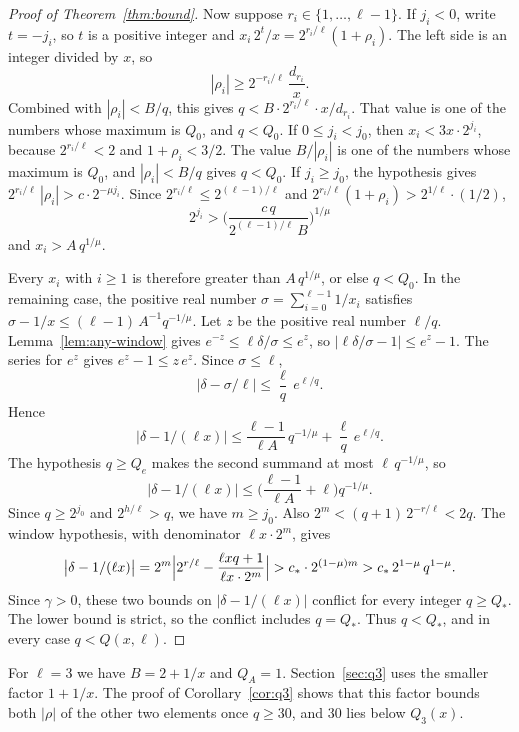 \documentclass[11pt]{article}
\begin{document}
\begin{proof}[Proof of Theorem~\ref{thm:bound}]
Now suppose $r_i \in \{1, \ldots, \ell-1\}$.
If $j_i < 0$, write $t = -j_i$, so $t$ is a positive integer and $x_i\, 2^{t}/x = 2^{r_i/\ell}(1+\rho_i)$.
The left side is an integer divided by $x$, so
\[
|\rho_i| \ge 2^{-r_i/\ell}\, \frac{d_{r_i}}{x}.
\]
Combined with $|\rho_i| < B/q$, this gives $q < B \cdot 2^{r_i/\ell} \cdot x / d_{r_i}$.
That value is one of the numbers whose maximum is $Q_0$, and $q < Q_0$.
If $0 \le j_i < j_0$, then $x_i < 3x \cdot 2^{j_i}$, because $2^{r_i/\ell} < 2$ and $1+\rho_i < 3/2$.
The value $B/|\rho_i|$ is one of the numbers whose maximum is $Q_0$, and $|\rho_i| < B/q$ gives $q < Q_0$.
If $j_i \ge j_0$, the hypothesis gives $2^{r_i/\ell}\, |\rho_i| > c \cdot 2^{-\mu j_i}$.
Since $2^{r_i/\ell} \le 2^{(\ell-1)/\ell}$ and $2^{r_i/\ell}(1+\rho_i) > 2^{1/\ell}\cdot(1/2)$,
\[
2^{j_i} > \Biggl( \frac{c\, q}{2^{(\ell-1)/\ell}\, B} \Biggr)^{1/\mu}
\]
and $x_i > A\, q^{1/\mu}$.

Every $x_i$ with $i \ge 1$ is therefore greater than $A\, q^{1/\mu}$, or else $q < Q_0$.
In the remaining case, the positive real number $\sigma = \sum_{i=0}^{\ell-1} 1/x_i$ satisfies $\sigma - 1/x \le (\ell-1)\, A^{-1} q^{-1/\mu}$.
Let $z$ be the positive real number $\ell/q$.
Lemma~\ref{lem:any-window} gives $e^{-z} \le \ell\delta/\sigma \le e^{z}$, so $|\ell\delta/\sigma - 1| \le e^{z} - 1$.
The series for $e^{z}$ gives $e^{z} - 1 \le z\, e^{z}$.
Since $\sigma \le \ell$,
\[
\bigl|\delta - \sigma/\ell\bigr| \le \frac{\ell}{q}\, e^{\ell/q}.
\]
Hence
\[
\bigl|\delta - 1/(\ell x)\bigr| \le \frac{\ell-1}{\ell A}\, q^{-1/\mu} + \frac{\ell}{q}\, e^{\ell/q}.
\]
The hypothesis $q \ge Q_e$ makes the second summand at most $\ell\, q^{-1/\mu}$, so
\[
\bigl|\delta - 1/(\ell x)\bigr| \le \Biggl( \frac{\ell-1}{\ell A} + \ell \Biggr) q^{-1/\mu}.
\]
Since $q \ge 2^{j_0}$ and $2^{h/\ell} > q$, we have $m \ge j_0$.
Also $2^m < (q+1)\, 2^{-r/\ell} < 2q$.
The window hypothesis, with denominator $\ell x \cdot 2^m$, gives
\[
\bigl|\delta - 1/(\ell x)\bigr|
= 2^m \Bigl| 2^{r/\ell} - \frac{\ell x q + 1}{\ell x \cdot 2^m} \Bigr|
> c_* \cdot 2^{(1-\mu)m}
> c_*\, 2^{1-\mu}\, q^{1-\mu}.
\]
Since $\gamma > 0$, these two bounds on $|\delta - 1/(\ell x)|$ conflict for every integer $q \ge Q_*$.
The lower bound is strict, so the conflict includes $q = Q_*$.
Thus $q < Q_*$, and in every case $q < Q(x, \ell)$.
\end{proof}

For $\ell = 3$ we have $B = 2 + 1/x$ and $Q_A = 1$.
Section~\ref{sec:q3} uses the smaller factor $1+1/x$.
The proof of Corollary~\ref{cor:q3} shows that this factor bounds both $|\rho|$ of the other two elements once $q \ge 30$, and $30$ lies below $Q_3(x)$.
\end{document}
